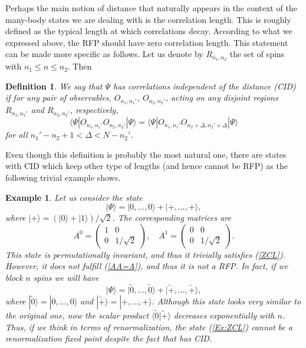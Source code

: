 \documentclass{elsarticle}
\newcommand{\be}{\begin{equation}}
\newcommand{\ee}{\end{equation}}
\newtheorem{defn}[thm]{Definition}
\newtheorem{ex}[thm]{Example}
\begin{document}
Perhaps the main notion of distance that naturally appears in the context of the many-body states we are dealing with is the correlation length. This is roughly defined as the typical length at which correlations decay. According to what we expressed above, the RFP should have zero correlation length. This statement can be made more specific as follows. Let us denote by $R_{n_1,n_2}$ the set of spins with $n_1\le n\le n_2$. Then
\begin{defn}
    We say that $\Psi$ has {\em correlations independent of the distance} (CID) if for any pair of observables, $O_{n_1,n_1'}$, $O_{n_2,n_2'}$, acting on any disjoint regions $R_{n_1,n_1'}$ and $R_{n_2,n_2'}$, respectively,
    \be
        \label{ZCL}
        \langle \Psi| O_{n_1,n_1'}O_{n_2,n_2'}|\Psi\rangle =
        \langle \Psi| O_{n_1,n_1'}O_{n_2+\Delta,n_2'+\Delta}|\Psi\rangle
    \ee
    for all $n_1'-n_2+1 < \Delta < N-n_2'$.
\end{defn}

Even though this definition is probably the most natural one, there are states with CID which keep other type of lengths (and hence cannot be RFP) as the following trivial example shows.

\begin{ex}
    Let us consider the state
    \be
        \label{Ex:ZCL}
        |\Psi\rangle = |0,\ldots,0\rangle + |+,\ldots,+\rangle,
    \ee
    where $|+\rangle=(|0\rangle+|1\rangle)/\sqrt{2}$. The corresponding matrices are
    \be
        A^0=\left( \begin{array}{cc} 1 & 0 \\ 0 & 1/\sqrt{2} \end{array}\right), \quad A^1=\left( \begin{array}{cc} 0 & 0 \\ 0 & 1/\sqrt{2} \end{array}\right).
    \ee
    This state is permutationally invariant, and thus it trivially satisfies (\ref{ZCL}). However, it does not fulfill (\ref{AA=A}), and thus it is not a RFP. In fact, if we block $n$ spins we will have
    \be
        |\Psi\rangle = |\tilde 0,\ldots,\tilde 0\rangle + |\tilde +,\ldots,\tilde +\rangle,
    \ee
    where $|\tilde 0\rangle=|0,\ldots,0\rangle$ and $|\tilde +\rangle= |+,\ldots,+\rangle$. Although this state looks very similar to the original one, now the scalar product $\langle \tilde 0|\tilde +\rangle$ decreases exponentially with $n$. Thus, if we think in terms of renormalization, the state (\ref{Ex:ZCL}) cannot be a renormalization fixed point despite the fact that has CID.
\end{ex}
\end{document}

